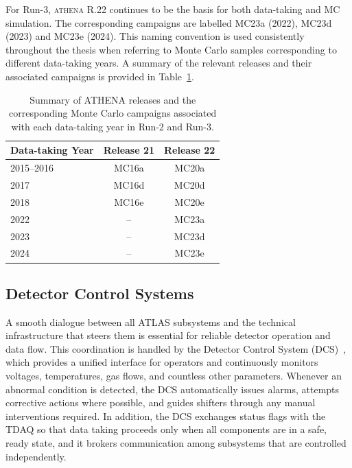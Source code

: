 For Run-3, \textsc{athena} R.22 continues to be the basis for both data-taking and MC simulation. The corresponding campaigns are labelled MC23a (2022), MC23d (2023) and MC23e (2024). This naming convention is used consistently throughout the thesis when referring to Monte Carlo samples corresponding to different data-taking years. A summary of the relevant releases and their associated campaigns is provided in Table~\ref{tab:athena_mc_campaigns}.

\begin{table}[htbp]
    \centering
    \small
    \renewcommand{\arraystretch}{1.3} %
    \setlength{\tabcolsep}{12pt}      %
    \caption{Summary of ATHENA releases and the corresponding Monte Carlo campaigns associated with each data-taking year in Run-2 and Run-3.}
    \label{tab:athena_mc_campaigns}
    \begin{tabular}{lcc}
        \hline
        \textbf{Data-taking Year} & \textbf{Release 21} & \textbf{Release 22} \\
        \hline
        2015--2016 & MC16a & MC20a \\
        2017       & MC16d & MC20d \\
        2018       & MC16e & MC20e \\
        \hline
        2022       & --    & MC23a \\
        2023       & --    & MC23d \\
        2024       & --    & MC23e \\
        \hline
    \end{tabular}
\end{table}



\subsection{Detector Control Systems}
\label{sec:dcs}
A smooth dialogue between all ATLAS subsystems and the technical infrastructure that steers them is essential for reliable detector operation and data flow. This coordination is handled by the Detector Control System (DCS)~\cite{atlas_DCS}, which provides a unified interface for operators and continuously monitors voltages, temperatures, gas flows, and countless other parameters. Whenever an abnormal condition is detected, the DCS automatically issues alarms, attempts corrective actions where possible, and guides shifters through any manual interventions required. In addition, the DCS exchanges status flags with the TDAQ so that data taking proceeds only when all components are in a safe, ready state, and it brokers communication among subsystems that are controlled independently.

